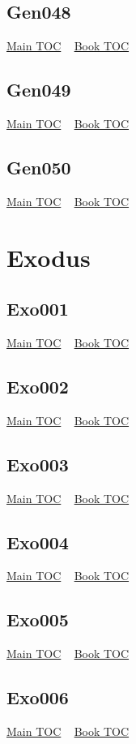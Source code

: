 \documentclass{book}
\begin{document}
  \section{Gen048}\hyperlink{toc}{Main TOC} ~ \hyperref[subsec:Gen]{Book TOC} 
  \section{Gen049}\hyperlink{toc}{Main TOC} ~ \hyperref[subsec:Gen]{Book TOC} 
  \section{Gen050}\hyperlink{toc}{Main TOC} ~ \hyperref[subsec:Gen]{Book TOC} 
  \chapter{Exodus} \label{subsec:Exo} \begin{multicols}{2} \minitoc \end{multicols}
  \section{Exo001}\hyperlink{toc}{Main TOC} ~ \hyperref[subsec:Exo]{Book TOC} 
  \section{Exo002}\hyperlink{toc}{Main TOC} ~ \hyperref[subsec:Exo]{Book TOC} 
  \section{Exo003}\hyperlink{toc}{Main TOC} ~ \hyperref[subsec:Exo]{Book TOC} 
  \section{Exo004}\hyperlink{toc}{Main TOC} ~ \hyperref[subsec:Exo]{Book TOC} 
  \section{Exo005}\hyperlink{toc}{Main TOC} ~ \hyperref[subsec:Exo]{Book TOC} 
  \section{Exo006}\hyperlink{toc}{Main TOC} ~ \hyperref[subsec:Exo]{Book TOC} 
\end{document}
